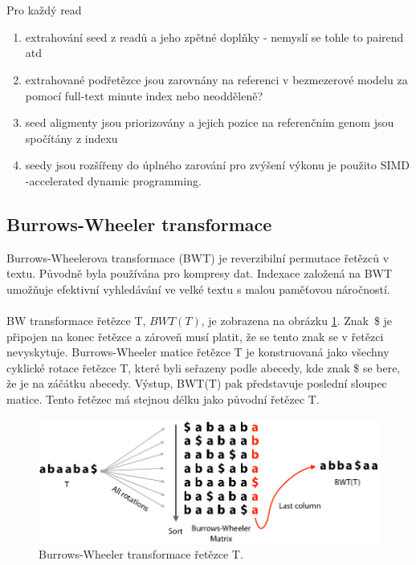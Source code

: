\documentclass[czech,DP]{thesiskiv}
\numberwithin{equation}{section}
\begin{document}
\\
\\
Pro každý read
\begin{enumerate}
	\item extrahování seed z readů a jeho zpětné doplňky - nemyslí se tohle to pairend atd
	\item extrahované podřetězce jsou zarovnány na referenci v bezmezerové modelu za pomocí full-text minute index
nebo neodděleně? 
	\item seed aligmenty jsou priorizovány a jejich pozice na referenčním genom jsou spočítány z indexu
	\item seedy jsou rozšířeny do úplného zarování pro zvýšení výkonu je použito SIMD -accelerated dynamic programming.
\end{enumerate}


\subsection{Burrows-Wheeler transformace}
Burrows-Wheelerova transformace (BWT) je reverzibilní permutace řetězců v textu. Původně byla používána pro kompresy dat. Indexace založená na BWT umožňuje efektivní vyhledávání ve velké textu s malou paměťovou náročností. 
\\
\\
BW transformace řetězce T, $BWT(T)$, je zobrazena na obrázku \ref{fig:bw_transform_1}. Znak~\$ je připojen na konec řetězce a zároveň musí platit, že se tento znak se v řetězci nevyskytuje. Burrows-Wheeler matice řetězce T je konstruovaná jako všechny cyklické rotace řetězce T, které byli seřazeny podle abecedy, kde znak \$ se bere, že je na záčátku abecedy. Výstup, BWT(T) pak představuje poslední sloupec matice. Tento řetězec má stejnou délku jako původní řetězec T. \cite{bowtie} 

\begin{figure}[H]		
		\centering
		\includegraphics[width=\textwidth]{./img/BWT_1.png}
		\caption{Burrows-Wheeler transformace řetězce T. \cite{bw_transform}}
		\label{fig:bw_transform_1}
\end{figure}
\end{document}
